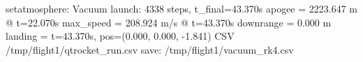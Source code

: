 \begin{console}
\ok setatmosphere: Vacuum
\ok launch: 4338 steps, t_final=43.370s
  apogee    = 2223.647 m @ t=22.070s
  max_speed = 208.924 m/s @ t=43.370s
  downrange = 0.000 m
  landing   = t=43.370s, pos=(0.000, 0.000, -1.841)
CSV /tmp/flight1/qtrocket_run.csv
\ok save: /tmp/flight1/vacuum_rk4.csv
\end{console}
